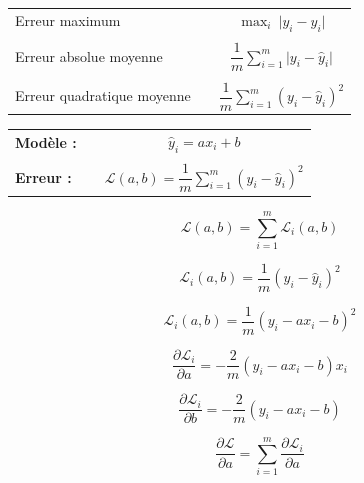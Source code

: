 \documentclass[aspectratio=169]{beamer}
\begin{document}
\begin{frame}
  \vfill
  \centering
  \begin{tabular}{lcc}
    Erreur maximum & \quad & $\displaystyle \max_i \  \vert y_i - \hat{y}_i \vert$ \\
    \\
    Erreur absolue moyenne & \quad & $\displaystyle \dfrac{1}{m} \sum_{i=1}^m \vert y_i - \hat{y}_i \vert$ \\
    \\
    Erreur quadratique moyenne & \quad & $\displaystyle \dfrac{1}{m} \sum_{i=1}^m \left( y_i - \hat{y}_i \right)^2$
  \end{tabular}
  \vfill
\end{frame}


\begin{frame}
  \vfill
  \begin{minipage}{.58\textwidth}
    \begin{tabular}{lcc}
      \textbf{Modèle :} & \quad & $\hat{y}_i = a x_i + b$ \\
      \\
      \textbf{Erreur :} & \quad & $\displaystyle \mathcal{L}(a, b) = \dfrac{1}{m} \sum_{i=1}^m \left( y_i - \hat{y}_i \right)^2$
    \end{tabular}
  \end{minipage}%
  \hfill
  \begin{minipage}{.38\textwidth}
    \begin{overprint}
      \[
      \mathcal{L}(a, b) = \sum_{i=1}^m \mathcal{L}_i(a, b)
      \]
      
      \[
      \mathcal{L}_i(a, b) = \dfrac{1}{m} \left( y_i - \hat{y}_i \right)^2
      \]
      
      \[
      \mathcal{L}_i(a, b) = \dfrac{1}{m} \left( y_i - a x_i - b \right)^2
      \]

      \[
      \dfrac{\partial \mathcal{L}_i}{\partial a} = -\dfrac{2}{m} \left( y_i - a x_i - b \right) x_i
      \]

      \[
      \dfrac{\partial \mathcal{L}_i}{\partial b} = -\dfrac{2}{m} \left( y_i - a x_i - b \right)
      \]

      \[
      \dfrac{\partial \mathcal{L}}{\partial a} = \sum_{i=1}^m \dfrac{\partial \mathcal{L}_i}{\partial a}
      \]
    \end{overprint}
  \end{minipage}
  \vfill
\end{frame}
\end{document}
